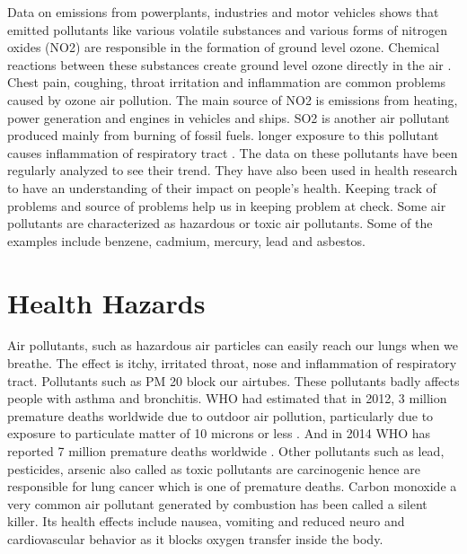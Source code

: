 \documentclass[sigconf]{acmart}
\begin{document}
{  Data on emissions from powerplants, industries and motor vehicles shows that emitted pollutants like various volatile substances and various forms of nitrogen oxides (NO2) are responsible in the formation of ground level ozone. Chemical reactions between these substances create ground level ozone directly in the air \cite{epa-gov}. Chest pain, coughing, throat irritation and inflammation are common problems caused by ozone air pollution. The main source of NO2 is emissions from heating, power generation and engines in vehicles and ships. SO2 is another air pollutant produced mainly from burning of fossil fuels. longer exposure to this pollutant causes inflammation of respiratory tract \cite{www-who}. The data on these pollutants have been regularly analyzed to see their trend. They have also been used in health research to have an understanding of their impact on people's health. Keeping track of problems and source of problems help us in keeping problem at check. Some air pollutants are characterized as hazardous or toxic air pollutants. Some of the examples include benzene, cadmium, mercury, lead and asbestos.
  \section{Health Hazards} Air pollutants, such as  hazardous air particles can easily reach our lungs when we breathe. The effect is itchy, irritated throat, nose and inflammation of respiratory tract. Pollutants such as PM 20 block our airtubes. These pollutants badly affects people with asthma and bronchitis. WHO had estimated that in 2012, 3 million premature deaths worldwide due to outdoor air pollution, particularly due to exposure to particulate matter of 10 microns or less \cite{www-who}. And in 2014 WHO has reported 7 million premature deaths worldwide \cite{www-who}. Other pollutants such as lead, pesticides, arsenic also called as toxic pollutants are carcinogenic hence are responsible for lung cancer which is one of premature deaths. Carbon monoxide a very common air pollutant generated by combustion has been called a silent killer. Its health effects include nausea, vomiting and reduced neuro and cardiovascular behavior as it blocks oxygen transfer inside the body.
  
}
\end{document}
